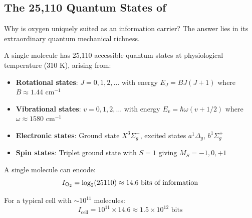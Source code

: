 \subsection{The 25,110 Quantum States of }

Why is oxygen uniquely suited as an information carrier? The answer lies in its extraordinary quantum mechanical richness.

\begin{definition}
\label{def:oxygen_states}
A single  molecule has 25,110 accessible quantum states at physiological temperature (310 K), arising from:
\begin{itemize}
\item \textbf{Rotational states}: $J = 0, 1, 2, \ldots$ with energy $E_J = B J(J+1)$ where $B \approx 1.44$ cm$^{-1}$
\item \textbf{Vibrational states}: $v = 0, 1, 2, \ldots$ with energy $E_v = \hbar\omega(v + 1/2)$ where $\omega \approx 1580$ cm$^{-1}$
\item \textbf{Electronic states}: Ground state $X^3\Sigma_g^-$, excited states $a^1\Delta_g$, $b^1\Sigma_g^+$
\item \textbf{Spin states}: Triplet ground state with $S = 1$ giving $M_S = -1, 0, +1$
\end{itemize}
\end{definition}

\begin{theorem}
\label{thm:oxygen_capacity}
A single  molecule can encode:
\begin{equation}
I_{\ce{O2}} = \log_2(25110) \approx 14.6 \text{ bits of information}
\end{equation}

For a typical cell with $\sim 10^{11}$  molecules:
\begin{equation}
I_{\text{cell}} = 10^{11} \times 14.6 \approx 1.5 \times 10^{12} \text{ bits}
\end{equation}
\end{theorem}

